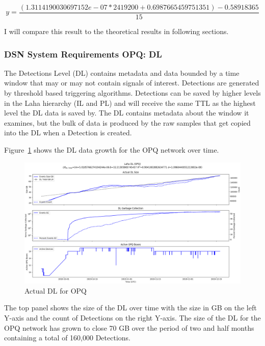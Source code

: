 \begin{equation}
    y = \frac{(1.3114190030697152e-07 * 2419200 + 0.6987665459751351) - 0.58918365}{15}
    \label{eq:aml_si_ex}
\end{equation}

I will compare this result to the theoretical results in following sections.

\subsubsection{DSN System Requirements OPQ: DL}

The Detections Level (DL) contains metadata and data bounded by a time window that may or may not contain signals of interest. Detections are generated by threshold based triggering algorithms. Detections can be saved by higher levels in the Laha hierarchy (IL and PL) and will receive the same TTL as the highest level the DL data is saved by. The DL contains metadata about the window it examines, but the bulk of data is produced by the raw samples that get copied into the DL when a Detection is created.

Figure~\ref{fig:actual_dl_opq} shows the DL data growth for the OPQ network over time.

\begin{figure}[H]
    \centering
    \includegraphics[width=\linewidth]{figures/actual_dl_opq.png}
    \caption{Actual DL for OPQ}
    \label{fig:actual_dl_opq}
\end{figure}

The top panel shows the size of the DL over time with the size in GB on the left Y-axis and the count of Detections on the right Y-axis. The size of the DL for the OPQ network has grown to close 70 GB over the period of two and half months containing a total of 160,000 Detections.

